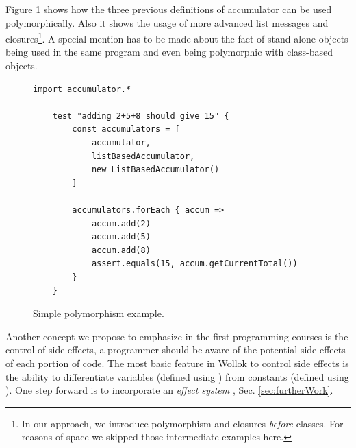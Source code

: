 \medskip
Figure \ref{fig:polymorphism} shows how the three previous definitions of accumulator can be used polymorphically. 
Also it shows the usage of more advanced list messages and closures\footnote{In our approach, we introduce polymorphism and closures \emph{before} classes. For reasons of space we skipped those intermediate examples here.}.
A special mention has to be made about the fact of stand-alone objects being used in the same program and even being polymorphic with class-based objects.

\begin{figure}[ht]
 \centering
 \begin{lstlisting}[language=Wollok]
 	import accumulator.*

	test "adding 2+5+8 should give 15" {
		const accumulators = [ 
			accumulator, 
			listBasedAccumulator,
			new ListBasedAccumulator()
		]

		accumulators.forEach { accum =>
			accum.add(2)
			accum.add(5)
			accum.add(8)
			assert.equals(15, accum.getCurrentTotal())	
		}
	}
 \end{lstlisting}
 
 \caption{\small Simple polymorphism example.}
 \label{fig:polymorphism}
\end{figure}


\bigskip 
Another concept we propose to emphasize in the first programming courses is the control of side effects, 
\ie a programmer should be aware of the potential side effects of each portion of code.
The most basic feature in Wollok to control side effects is the ability to 
differentiate variables (defined using )
from constants (defined using ).
One step forward is to incorporate an \emph{effect system} \cite{nielson_type_1999}, \cf Sec. \ref{sec:furtherWork}.

